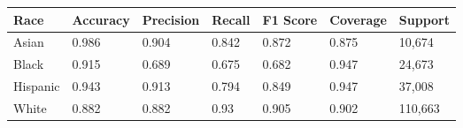 \begin{tabular}{lllllll}
\toprule
Race & Accuracy & Precision & Recall & F1 Score & Coverage & Support \\
\midrule
Asian & 0.986 & 0.904 & 0.842 & 0.872 & 0.875 & 10,674 \\
Black & 0.915 & 0.689 & 0.675 & 0.682 & 0.947 & 24,673 \\
Hispanic & 0.943 & 0.913 & 0.794 & 0.849 & 0.947 & 37,008 \\
White & 0.882 & 0.882 & 0.93 & 0.905 & 0.902 & 110,663 \\
\bottomrule
\end{tabular}
